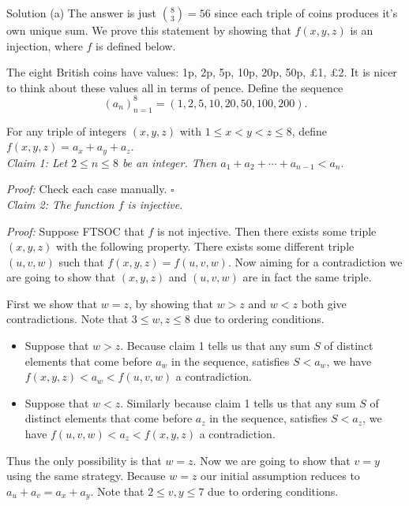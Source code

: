 \documentclass{article}
\begin{document}
\begin{solution}{Solution}
(a) The answer is just $\binom{8}{3} = 56$ since each triple of coins
produces it's own unique sum. We prove this statement by showing that
$f(x,y,z)$ is an injection, where $f$ is defined below. \vspace{0.2cm}

The eight British coins have values: 1p, 2p, 5p, 10p, 20p, 50p, £1, £2.
It is nicer to think about these values all in terms of pence. Define the
sequence
$$
(a_n)_{n=1}^8 = (1, 2, 5, 10, 20, 50, 100, 200).
$$

For any triple of integers $(x,y,z)$ with $1 \leq x < y < z \leq 8$,
define $f(x,y,z) = a_x + a_y + a_z$.
\\

\textit{Claim 1: Let $2 \leq n \leq 8$ be an integer. Then
$
a_1 + a_2 + \cdots + a_{n-1} < a_n.
$
}\vspace{0.2cm}

\textit{Proof: } Check each case manually. $\square$ \\

\textit{Claim 2: The function $f$ is injective.} \vspace{0.2cm}

\textit{Proof: } Suppose FTSOC that $f$ is not injective. Then there exists
some triple $(x,y,z)$ with the following property. There exists some
different triple $(u,v,w)$ such that $f(x,y,z) = f(u,v,w)$. Now aiming for
a contradiction we are going to show that $(x,y,z)$ and $(u,v,w)$ are in
fact the same triple. \vspace{0.2cm}

First we show that $w = z$, by showing that $w > z$ and $w < z$ both give
contradictions. Note that $3\leq w,z \leq 8$ due to ordering conditions.
\begin{itemize}
\item Suppose that $w > z$. Because claim 1 tells us that any sum $S$ of distinct
elements that come before $a_w$ in the sequence, satisfies $S < a_w$, we
have $f(x,y,z) < a_w < f(u,v,w)$ a contradiction.

\item
Suppose that $w < z$. Similarly because claim 1 tells us that any sum $S$
of distinct elements that come before $a_z$ in the sequence,
satisfies $S < a_z$, we have $f(u,v,w) < a_z < f(x,y,z)$ a contradiction.

\end{itemize}

Thus the only possibility is that $w = z$. Now we are going to show that
$v = y$ using the same strategy. Because $w=z$ our initial assumption
reduces to $a_u + a_v = a_x + a_y$. Note that $2 \leq v,y \leq 7$ due to
ordering conditions.


\end{solution}
\end{document}
